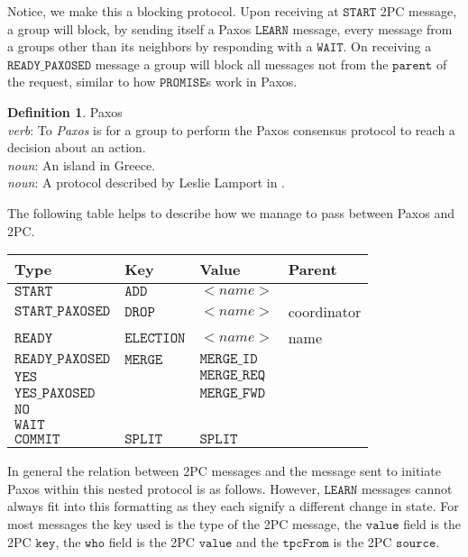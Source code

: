 \documentclass{amsart}
\theoremstyle{definition}
\newtheorem{defn}[thm]{Definition}
\theoremstyle{remark}
\numberwithin{equation}{section}
\begin{document}
Notice, we make this a blocking protocol. Upon receiving at $\mathtt{START}$ 2PC message, a group will block, by sending itself a Paxos $\mathtt{LEARN}$ message, every message from a groups other than its neighbors by responding with a $\mathtt{WAIT}$. On receiving a $\mathtt{READY\_PAXOSED}$ message a group will block all messages not from the $\mathtt{parent}$ of the request, similar to how $\mathtt{PROMISE}$s work in Paxos.
\begin{defn}
Paxos\\
\textit{verb}: To \textit{Paxos} is for a group to perform the Paxos consensus protocol to reach a decision about an action.\\
\textit{noun}: An island in Greece. \\
\textit{noun}: A protocol described by Leslie Lamport in \cite{Paxos}.
\end{defn}
The following table helps to describe how we manage to pass between Paxos and 2PC. 
\begin{center}
\begin{tabular}{| p{2.5cm} | l | l | l |}
\hline
Type & Key & Value & Parent \\ \hline
$ \mathtt{START}$ & $ \mathtt{ADD}$ & $<name>$ & \\ \hline
$ \mathtt{START\_PAXOSED}$ & $ \mathtt{DROP}$ & $<name>$ & coordinator\\ \hline
$ \mathtt{READY}$  & $ \mathtt{ELECTION}$ & $<name>$ & name\\ \hline
$ \mathtt{READY\_PAXOSED}$ & $ \mathtt{MERGE}$ & $ \mathtt{MERGE\_ID}$ & \\ \hline
$ \mathtt{YES}$ & & $ \mathtt{MERGE\_REQ}$ & \\ \hline
$ \mathtt{YES\_PAXOSED}$ & & $ \mathtt{MERGE\_FWD}$ & \\ \hline
$ \mathtt{NO}$ &  &  & \\ \hline
$ \mathtt{WAIT}$ & & & \\ \hline
$ \mathtt{COMMIT}$ & $ \mathtt{SPLIT}$ & $ \mathtt{SPLIT}$ & \\ \hline
\end{tabular} 
\end{center}
In general the relation between 2PC messages and the message sent to initiate Paxos within this nested protocol is as follows. However, $\mathtt{LEARN}$ messages cannot always fit into this formatting as they each signify a different change in state. For most messages the key used is the type of the 2PC message, the $\mathtt{value}$ field is the 2PC $\mathtt{key}$, the $\mathtt{who}$ field is the 2PC $\mathtt{value}$ and the $\mathtt{tpcFrom}$ is the 2PC $\mathtt{source}$. 
\end{document}
